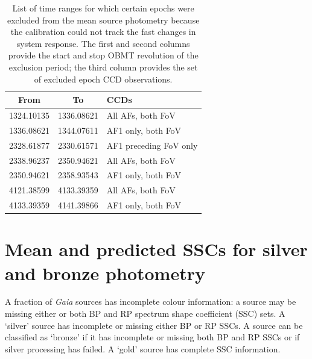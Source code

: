 \documentclass{aa}
\newcommand{\gaia}{\textit{Gaia}\xspace}
\begin{document}
\begin{appendix}
\begin{table}[hp]
    \caption{List of time ranges for which certain epochs were excluded from the mean source photometry because the calibration could not track the fast changes in system response. The first and second columns provide the start and stop OBMT revolution of the exclusion period; the third column provides the set of excluded epoch CCD observations.}
    \label{tab:af_exclusions}
    \centering
    \begin{tabular}{c|c|l}
    \hline\hline
    From & To & CCDs\\
    \hline
    1324.10135 & 1336.08621 & All AFs, both FoV\\
    1336.08621 & 1344.07611 & AF1 only, both FoV\\
    2328.61877 & 2330.61571 & AF1 preceding FoV only\\
    2338.96237 & 2350.94621 & All AFs, both FoV\\
    2350.94621 & 2358.93543 & AF1 only, both FoV\\
    4121.38599 & 4133.39359 & All AFs, both FoV\\
    4133.39359 & 4141.39866 & AF1 only, both FoV\\
    \hline
    \end{tabular}
\end{table}

\section{Mean and predicted SSCs for silver and bronze photometry}\label{sec:sscs}

A fraction of \gaia sources has incomplete colour information: a source may be missing either or both BP and RP spectrum shape coefficient (SSC) sets. A `silver' source has incomplete or missing either BP or RP SSCs. A source can be classified as `bronze' if it has incomplete or missing both BP and RP SSCs or if silver processing has failed. A `gold' source has complete SSC information.


\end{appendix}
\end{document}

